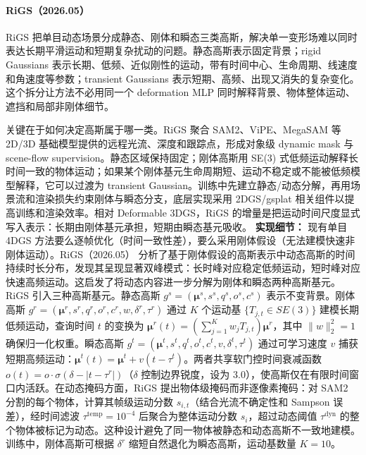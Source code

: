\paragraph{RiGS（2026.05）\cite{2605_23672}}
RiGS 把单目动态场景分成静态、刚体和瞬态三类高斯，解决单一变形场难以同时表达长期平滑运动和短期复杂扰动的问题。静态高斯表示固定背景；rigid Gaussians 表示长期、低频、近似刚性的运动，带有时间中心、生命周期、线速度和角速度等参数；transient Gaussians 表示短期、高频、出现又消失的复杂变化。这个拆分让方法不必用同一个 deformation MLP 同时解释背景、物体整体运动、遮挡和局部非刚体细节。

关键在于如何决定高斯属于哪一类。RiGS 聚合 SAM2、ViPE、MegaSAM 等 2D/3D 基础模型提供的远程光流、深度和跟踪点，形成对象级 dynamic mask 与 scene-flow supervision。静态区域保持固定；刚体高斯用 SE(3) 式低频运动解释长时间一致的物体运动；如果某个刚体基元生命周期短、运动不稳定或不能被低频模型解释，它可以过渡为 transient Gaussian。训练中先建立静态/动态分解，再用场景流和渲染损失约束刚体与瞬态分支，底层实现采用 2DGS/gsplat 相关组件以提高训练和渲染效率。相对 Deformable 3DGS，RiGS 的增量是把运动时间尺度显式写入表示：长期由刚体基元承担，短期由瞬态基元吸收。
\textbf{实现细节：} 现有单目 4DGS 方法要么逐帧优化（时间一致性差），要么采用刚体假设（无法建模快速非刚体运动）。RiGS（2026.05） 分析了基于刚体假设的高斯表示中动态高斯的时间持续时长分布，发现其呈现显著双峰模式：长时峰对应稳定低频运动，短时峰对应快速高频运动。这启发了将动态内容进一步分解为刚体和瞬态两种高斯基元。RiGS 引入三种高斯基元。静态高斯 $g^s = (\boldsymbol{\mu}^s, s^s, q^s, o^s, c^s)$ 表示不变背景。刚体高斯 $g^r = (\boldsymbol{\mu}^r, s^r, q^r, o^r, c^r, w, \delta^r, \tau^r)$ 通过 $K$ 个运动基 $\{T_{j,t} \in SE(3)\}$ 建模长期低频运动，查询时间 $t$ 的变换为 $\boldsymbol{\mu}^r(t) = (\sum_{j=1}^{K}w_j T_{j,t})\boldsymbol{\mu}^r$，其中 $\|w\|_2^2=1$ 确保归一化权重。瞬态高斯 $g^t = (\boldsymbol{\mu}^t, s^t, q^t, o^t, c^t, v, \delta^t, \tau^t)$ 通过可学习速度 $v$ 捕获短期高频运动：$\boldsymbol{\mu}^t(t) = \boldsymbol{\mu}^t + v(t - \tau^t)$。两者共享软门控时间衰减函数 $o(t) = o \cdot \sigma(\delta - |t - \tau^r|)$（$\delta$ 控制边界锐度，设为 3.0），使高斯仅在有限时间窗口内活跃。在动态掩码方面，RiGS 提出物体级掩码而非逐像素掩码：对 SAM2 分割的每个物体，计算其帧级运动分数 $s_{i,t}$（结合光流不确定性和 Sampson 误差），经时间滤波 $\tau^{\mathrm{temp}} = 10^{-4}$ 后聚合为整体运动分数 $s_i$，超过动态阈值 $\tau^{\mathrm{dyn}}$ 的整个物体被标记为动态。这种设计避免了同一物体被静态和动态高斯不一致地建模。训练中，刚体高斯可根据 $\delta^r$ 缩短自然退化为瞬态高斯，运动基数量 $K=10$。
